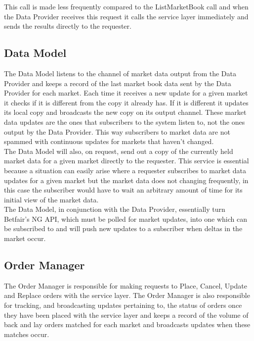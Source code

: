 			This call is made less frequently compared to the ListMarketBook call and when the Data Provider receives this request it calls the service layer immediately and sends the results directly to the requester.\\
	
	
	\subsection{Data Model}
		The Data Model listens to the channel of market data output from the Data Provider and keeps a record of the last market book data sent by the Data Provider for each market. Each time it receives a new update for a given market it checks if it is different from the copy it already has. If it is different it updates its local copy and broadcasts the new copy on its output channel. These market data updates are the ones that subscribers to the system listen to, not the ones output by the Data Provider. This way subscribers to market data are not spammed with continuous updates for markets that haven't changed.\\
		
		The Data Model will also, on request, send out a copy of the currently held market data for a given market directly to the requester. This service is essential because a situation can easily arise where a requester subscribes to market data updates for a given market but the market data does not changing frequently, in this case the subscriber would have to wait an arbitrary amount of time for its initial view of the market data.\\
		
		The Data Model, in conjunction with the Data Provider, essentially turn Betfair's NG API, which must be polled for market updates, into one which can be subscribed to and will push new updates to a subscriber when deltas in the market occur.
		
	\subsection{Order Manager}
					
		The Order Manager is responsible for making requests to Place, Cancel, Update and Replace orders with the service layer. The Order Manager is also responsible for tracking, and broadcasting updates pertaining to, the status of orders once they have been placed with the service layer and keeps a record of the volume of back and lay orders matched for each market and broadcasts updates when these matches occur.\\
		
